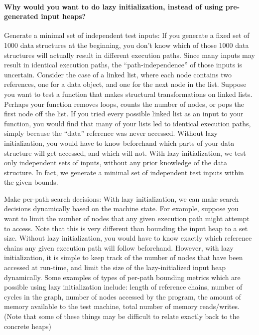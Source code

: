 \paragraph{Why would you want to do lazy initialization, instead of using pre-generated input heaps?}
\begin{compactdesc}
\item[Generate a minimal set of independent test inputs:] 
If you generate a fixed set of 1000 data structures at the beginning,
you don’t know which of those 1000 data structures will actually
result in different execution paths. Since many inputs may result in
identical execution paths, the “path-independence” of those inputs is
uncertain. Consider the case of a linked list, where each node
contains two references, one for a data object, and one for the next
node in the list. Suppose you want to test a function that makes
structural transformations on linked lists. Perhaps your function
removes loops, counts the number of nodes, or pops the first node off
the list. If you tried every possible linked list as an input to your
function, you would find that many of your lists led to identical
execution paths, simply because the “data” reference was never
accessed. Without lazy initialization, you would have to know
beforehand which parts of your data structure will get accessed, and
which will not. With lazy initialization, we test only independent
sets of inputs, without any prior knowledge of the data structure. In
fact, we generate a minimal set of independent test inputs within the
given bounds.

\item[Make per-path search decisions:] 
With lazy initialization, we can make search decisions dynamically
based on the machine state. For example, suppose you want to limit the
number of nodes that any given execution path might attempt to
access. Note that this is very different than bounding the input heap
to a set size. Without lazy initialization, you would have to know
exactly which reference chains any given execution path will follow
beforehand. However, with lazy initialization, it is simple to keep
track of the number of nodes that have been accessed at run-time, and
limit the size of the lazy-initialized input heap dynamically. Some
examples of types of per-path bounding metrics which are possible
using lazy initialization include: length of reference chains, number
of cycles in the graph, number of nodes accessed by the program, the
amount of memory available to the test machine, total number of memory
reads/writes. (Note that some of these things may be difficult to
relate exactly back to the concrete heaps)


\end{compactdesc}
